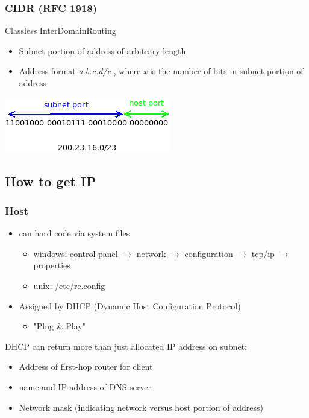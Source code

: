 \documentclass[11pt]{article}
\begin{document}
\subsubsection{CIDR (RFC 1918)}
\label{sec:orgaacbf6b}
Classless InterDomainRouting
\begin{itemize}
\item Subnet portion of address of arbitrary length
\item Address format \emph{a.b.c.d/c} , where \emph{x} is the number of bits in
subnet portion of address
\end{itemize}

\begin{center}
\includegraphics[width=.9\linewidth]{../img/cidr.png}
\end{center}


\subsection{How to get IP}
\label{sec:orgb272ce1}

\subsubsection{Host}
\label{sec:org60dfcfc}
\begin{itemize}
\item can hard code via system files 
\begin{itemize}
\item windows: control-panel \(\rightarrow\) network \(\rightarrow\)
configuration \(\rightarrow\) tcp/ip \(\rightarrow\) properties
\item unix: /etc/rc.config
\end{itemize}

\item Assigned by DHCP (Dynamic Host Configuration Protocol)
\begin{itemize}
\item "Plug \& Play"
\end{itemize}
\end{itemize}

DHCP can return more than just allocated IP address on subnet:
\begin{itemize}
\item Address of first-hop router for client
\item name and IP address of DNS server
\item Network mask (indicating network versus host portion of address)
\end{itemize}
\end{document}
